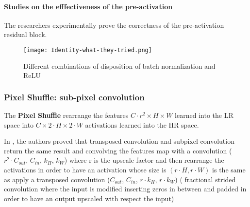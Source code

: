 \paragraph{Studies on the efffectiveness of the pre-activation}
The researchers experimentally prove the correctness of the pre-activation residual block.
\begin{figure}[H]
    \centering
    \texttt{[image: Identity-what-they-tried.png]}
    \caption{Different combinations of disposition of batch normalization and ReLU}
\end{figure}


\subsubsection{Pixel Shuffle: sub-pixel convolution \cite{subpixelconvolution}}

The \textbf{Pixel Shuffle} rearrange the features $C \cdot r^2 \times H \times W$ learned into the LR space into $C \times 2 \cdot H \times 2 \cdot W$ activations learned into the HR space.

In \cite{eli5subpixelconvolution}, the authors proved that transposed convolution and subpixel convolution return the same result and convolving the features map with a convolution ($r^2 \cdot C_{out}$, $C_{in}$, $k_H$, $k_W$) where r is the upscale factor and then rearrange the activations in order to have an activation whose size is $(r \cdot H, r \cdot W)$ is the same as apply a transposed convolution ($C_{out}$, $C_{in}$, $r \cdot k_H$, $r \cdot k_W$)  ( fractional strided convolution where the input is modified inserting zeros in between and padded in order to have an output upscaled with respect the input) 